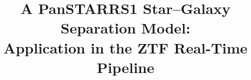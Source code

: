 \documentclass[twocolumn]{aastex62}
\begin{document}
\title{A PanSTARRS1 Star--Galaxy Separation Model: \\
       Application in the ZTF Real-Time Pipeline
       }


\end{document}
